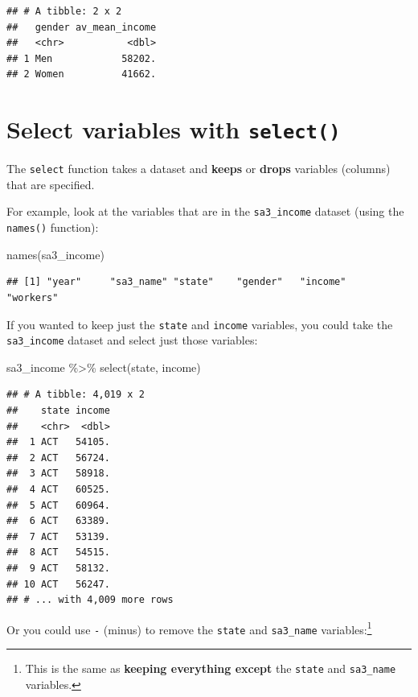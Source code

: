 \documentclass[
]{book}
\newenvironment{Shaded}{\begin{snugshade}}{\end{snugshade}}
\newcommand{\FunctionTok}[1]{\textcolor[rgb]{0.00,0.00,0.00}{#1}}
\newcommand{\NormalTok}[1]{#1}
\newcommand{\SpecialCharTok}[1]{\textcolor[rgb]{0.00,0.00,0.00}{#1}}
\begin{document}
\begin{verbatim}
## # A tibble: 2 x 2
##   gender av_mean_income
##   <chr>           <dbl>
## 1 Men            58202.
## 2 Women          41662.
\end{verbatim}

\hypertarget{select-variables-with-select}{%
\section{\texorpdfstring{Select variables with \texttt{select()}}{Select variables with select()}}\label{select-variables-with-select}}

The \texttt{select} function takes a dataset and \textbf{keeps} or \textbf{drops} variables (columns) that are specified.

For example, look at the variables that are in the \texttt{sa3\_income} dataset (using the \texttt{names()} function):

\begin{Shaded}
\begin{Highlighting}[]
\FunctionTok{names}\NormalTok{(sa3\_income)}
\end{Highlighting}
\end{Shaded}

\begin{verbatim}
## [1] "year"     "sa3_name" "state"    "gender"   "income"   "workers"
\end{verbatim}

If you wanted to keep just the \texttt{state} and \texttt{income} variables, you could take the \texttt{sa3\_income} dataset and select just those variables:

\begin{Shaded}
\begin{Highlighting}[]
\NormalTok{sa3\_income }\SpecialCharTok{\%\textgreater{}\%} 
  \FunctionTok{select}\NormalTok{(state, income)}
\end{Highlighting}
\end{Shaded}

\begin{verbatim}
## # A tibble: 4,019 x 2
##    state income
##    <chr>  <dbl>
##  1 ACT   54105.
##  2 ACT   56724.
##  3 ACT   58918.
##  4 ACT   60525.
##  5 ACT   60964.
##  6 ACT   63389.
##  7 ACT   53139.
##  8 ACT   54515.
##  9 ACT   58132.
## 10 ACT   56247.
## # ... with 4,009 more rows
\end{verbatim}

Or you could use \texttt{-} (minus) to remove the \texttt{state} and \texttt{sa3\_name} variables:\footnote{This is the same as \textbf{keeping everything except} the \texttt{state} and \texttt{sa3\_name} variables.}
\end{document}
